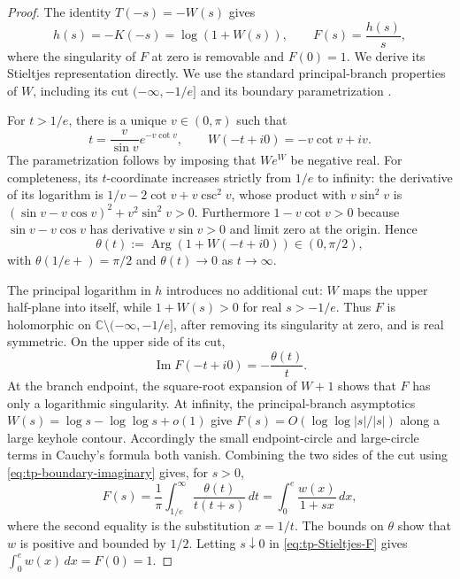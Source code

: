 \documentclass[11pt,a4paper]{article}
\theoremstyle{definition}
\theoremstyle{remark}
\numberwithin{equation}{section}
\begin{document}
\begin{proof}
The identity $T(-s)=-W(s)$ gives
\[
 h(s)=-K(-s)=\log(1+W(s)),\qquad F(s)=\frac{h(s)}s,
\]
where the singularity of $F$ at zero is removable and $F(0)=1$.
We derive its Stieltjes representation directly.  We use the standard
principal-branch properties of $W$, including its cut
$(-\infty,-1/e]$ and its boundary parametrization
\cite{Lambert2012}.

For $t>1/e$, there is a unique $v\in(0,\pi)$ such that
\begin{equation}
 t=\frac{v}{\sin v}e^{-v\cot v},
 \qquad W(-t+i0)=-v\cot v+iv.
 \label{eq:tp-W-boundary}
\end{equation}
The parametrization follows by imposing that $We^W$ be negative real.
For completeness, its $t$-coordinate increases strictly from $1/e$ to
infinity: the derivative of its logarithm is
$1/v-2\cot v+v\csc^2v$, whose product with $v\sin^2v$ is
$(\sin v-v\cos v)^2+v^2\sin^2v>0$.
Furthermore $1-v\cot v>0$ because
$\sin v-v\cos v$ has derivative $v\sin v>0$ and limit zero at the
origin.  Hence
\[
 \theta(t):=\operatorname{Arg}(1+W(-t+i0))\in(0,\pi/2),
\]
with $\theta(1/e+)=\pi/2$ and $\theta(t)\to0$ as $t\to\infty$.

The principal logarithm in $h$ introduces no additional cut: $W$ maps
the upper half-plane into itself, while $1+W(s)>0$ for real $s>-1/e$.
Thus $F$ is holomorphic on $\mathbb C\setminus(-\infty,-1/e]$, after
removing its singularity at zero, and is real symmetric.  On the upper
side of its cut,
\begin{equation}
 \operatorname{Im}F(-t+i0)=-\frac{\theta(t)}t.
 \label{eq:tp-boundary-imaginary}
\end{equation}
At the branch endpoint, the square-root expansion of $W+1$ shows that
$F$ has only a logarithmic singularity.  At infinity, the principal-branch
asymptotics $W(s)=\log s-\log\log s+o(1)$ give
$F(s)=O(\log\log|s|/|s|)$ along a large keyhole contour.
Accordingly the small endpoint-circle and large-circle terms in Cauchy's
formula both vanish.  Combining the two sides of the cut using
\eqref{eq:tp-boundary-imaginary} gives, for $s>0$,
\begin{equation}
 F(s)=\frac1\pi\int_{1/e}^{\infty}
             \frac{\theta(t)}{t(t+s)}\,dt
     =\int_0^e\frac{w(x)}{1+sx}\,dx,
 \label{eq:tp-Stieltjes-F}
\end{equation}
where the second equality is the substitution $x=1/t$.
The bounds on $\theta$ show that $w$ is positive and bounded by $1/2$.
Letting $s\downarrow0$ in \eqref{eq:tp-Stieltjes-F} gives
$\int_0^e w(x)\,dx=F(0)=1$.


\end{proof}
\end{document}
